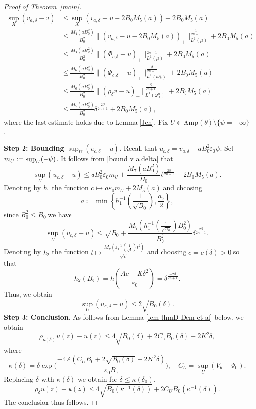 \documentclass[a4paper,11pt]{amsart}
\numberwithin{equation}{section}
\theoremstyle{definition}
\begin{document}
\begin{proof}[Proof of Theorem~\ref{main}]
\begin{equation}\label{bound v a delta}
    \begin{split}
         \sup_X (v_{a, \delta}-u)&\leq \sup_X (v_{a, \delta}-u-2B_0 M_5(a))+2B_0 M_5(a)\\
    &\leq\frac{M_4(aB_0^2)}{B_0^2}\|(v_{a, \delta}-u-2B_0 M_5(a))_+\|^{\frac{1}{2n+1}}_{L^1(\mu)}+2B_0 M_5(a) \\
    &\leq\frac{M_4(aB_0^2)}{B_0^2}\|(\Phi_{c, \delta}-u)_+\|^{\frac{1}{2n+1}}_{L^1(\mu)}+2B_0 M_5(a) \\
      &\leq\frac{M_6(aB_0^2)}{B_0^2}\|(\Phi_{c, \delta}-u)_+\|^{\frac{\beta}{2n+1}}_{L^1(\omega_X^n)}+2B_0 M_5(a) \\
   &\leq\frac{M_6(aB_0^2)}{B_0^2}\|(\rho_{\delta}u-u)_+\|^{\frac{\beta}{2n+1}}_{L^1(\omega_X^n)}+2B_0 M_5(a)\\
    &\leq\frac{M_7(aB_0^2)}{B_0^2}\delta^{\frac{2\beta}{2n+1}}+2B_0 M_5(a),
    \end{split}
\end{equation}
where the last estimate holds due to Lemma \ref{Jen}.
Fix $U\Subset \textrm{Amp}(\theta)\setminus\{
\psi=-\infty\}$. 

\smallskip
\noindent\textbf{Step 2: Bounding $\sup_U(u_{c,\delta}-u)$.}
Recall that $u_{c,\delta}=v_{a,\delta}-aB_0^2\varepsilon_0\psi$. Set $m_U:=\sup_{\Bar{U}}(-\psi)$.
It follows from \eqref{bound v a delta} that
$$\sup_U(u_{c, \delta}-u)\leq aB_0^2\varepsilon_0m_U+\frac{M_7(aB_0^2)}{B_0}\delta^{\frac{2\beta}{2n+1}}+2B_0 M_5(a).$$
Denoting by $h_1$ the function $a\mapsto a\varepsilon_0m_U+2M_5(a)$ and choosing $$a\coloneqq\min\left\{h_1^{-1}\left(\frac{1}{\sqrt{B_0}}\right),\frac{a_0}{2}\right\},$$ since $B_0^2\leq B_0$ we have
$$\sup_U(u_{c, \delta}-u)\leq \sqrt{B_0}+\frac{M_7\left(h_1^{-1}\left(\frac{1}{\sqrt{B_0}}\right)B_0^2\right)}{B_0^2}\delta^{\frac{2\beta}{2n+1}}.$$
Denoting by $h_2$ the function $t\mapsto \frac{M_7\left(h_1^{-1}\left(\frac{1}{\sqrt{t}}\right)t^2\right)}{\sqrt{t^5}}$ and choosing $c=c(\delta)>0$ so that
$$h_2(B_0)=h\left( \frac{Ac+K\delta^2}{\varepsilon_0}\right)=\delta^{\frac{-2\beta}{2n+1}}.$$ 
Thus, we obtain
$$\sup_U(u_{c, \delta}-u)\leq 2\sqrt{B_0(\delta)} .$$
\noindent \textbf{Step 3: Conclusion.}
As follows from Lemma \ref{lem thmD Dem et al} below, we obtain
\begin{equation*}
    \rho_{\kappa(\delta)}u(z)-u(z)\leq 4\sqrt{B_0(\delta)}+2C_U B_0(\delta)+2K^2\delta,
\end{equation*} where $$\kappa(\delta)=\delta\exp\Big(\dfrac{-4A(C_UB_0+2\sqrt{B_0(\delta)}+2K^2\delta)}{\varepsilon_0B_0} \Big),\quad C_U=\sup_U(V_\theta-\Psi_0).$$
Replacing $\delta$ with $\kappa (\delta)$ we obtain for $\delta\leq \kappa(\delta_0)$,
\[\rho_\delta u(z)-u(z)\leq 4\sqrt{B_0(\kappa^{-1} (\delta))}+2C_U B_0(\kappa^{-1} (\delta)). \]
The conclusion thus follows.
\end{proof}
\end{document}
